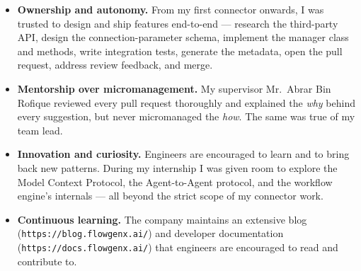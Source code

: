 \begin{itemize}[leftmargin=*]
    \item \textbf{Ownership and autonomy.} From my first connector
    onwards, I was trusted to design and ship features end-to-end ---
    research the third-party API, design the connection-parameter
    schema, implement the manager class and methods, write integration
    tests, generate the metadata, open the pull request, address
    review feedback, and merge.

    \item \textbf{Mentorship over micromanagement.} My supervisor
    Mr.~Abrar Bin Rofique reviewed every pull request thoroughly and
    explained the \emph{why} behind every suggestion, but never
    micromanaged the \emph{how}. The same was true of my team lead.

    \item \textbf{Innovation and curiosity.} Engineers are
    encouraged to learn and to bring back new patterns. During my
    internship I was given room to explore the Model Context Protocol,
    the Agent-to-Agent protocol, and the workflow engine's internals
    --- all beyond the strict scope of my connector work.

    \item \textbf{Continuous learning.} The company maintains an
    extensive blog (\texttt{https://blog.flowgenx.ai/}) and developer
    documentation (\texttt{https://docs.flowgenx.ai/}) that engineers
    are encouraged to read and contribute to.

\end{itemize}
